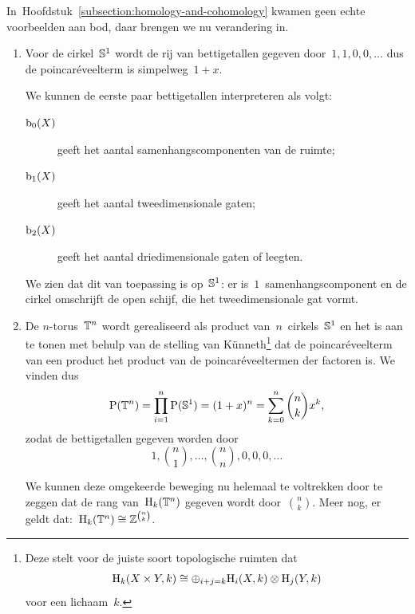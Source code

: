 \documentclass[a4paper,11pt,openany,oneside,article]{memoir}
\begin{document}
In~Hoofdstuk~\ref{subsection:homology-and-cohomology} kwamen geen echte voorbeelden aan bod, daar brengen we nu verandering in.
\begin{example} \hfil
  \label{example:betti-numbers}
  \begin{enumerate}
    \item Voor de cirkel~$\mathbb{S}^1$ wordt de rij van bettigetallen gegeven door~$1,1,0,0,\ldots$ dus de poincar\'eveelterm is simpelweg~$1+x$.
      
      We kunnen de eerste paar bettigetallen interpreteren als volgt:
      \begin{description}
        \item[$\mathrm{b}_0(X)$] geeft het aantal samenhangscomponenten van de ruimte;
        \item[$\mathrm{b}_1(X)$] geeft het aantal tweedimensionale gaten;
        \item[$\mathrm{b}_2(X)$] geeft het aantal driedimensionale gaten of leegten.
      \end{description}

      We zien dat dit van toepassing is op~$\mathbb{S}^1$: er is~$1$~samenhangscomponent en de cirkel omschrijft de open schijf, die het tweedimensionale gat vormt.

    \item De $n$\nobreakdash-torus~$\mathbb{T}^n$ wordt gerealiseerd als product van~$n$~cirkels~$\mathbb{S}^1$ en het is aan te tonen met behulp van de stelling van K\"unneth\footnote{Deze stelt voor de juiste soort topologische ruimten dat
      \begin{equation}
        \mathrm{H}_k(X\times Y,k)\cong\oplus_{i+j=k}\mathrm{H}_i(X,k)\otimes\mathrm{H}_j(Y,k)
      \end{equation}
      voor een lichaam~$k$.
      } dat de poincar\'eveelterm van een product het product van de poincar\'eveeltermen der factoren is. We vinden dus
      \begin{equation}
        \mathrm{P}(\mathbb{T}^n)=\prod_{i=1}^n\mathrm{P}(\mathbb{S}^1)=(1+x)^n=\sum_{k=0}^n\binom{n}{k}x^k,
      \end{equation}
      zodat de bettigetallen gegeven worden door
      \begin{equation}
        1,\binom{n}{1},\ldots,\binom{n}{n},0,0,0,\ldots
      \end{equation}

      We kunnen deze omgekeerde beweging nu helemaal te voltrekken door te zeggen dat de rang van~$\mathrm{H}_k(\mathbb{T}^n)$ gegeven wordt door~$\binom{n}{k}$. Meer nog, er geldt dat:~$\mathrm{H}_k(\mathbb{T}^n)\cong\mathbb{Z}^{\binom{n}{k}}$.


\end{enumerate}
\end{example}
\end{document}
